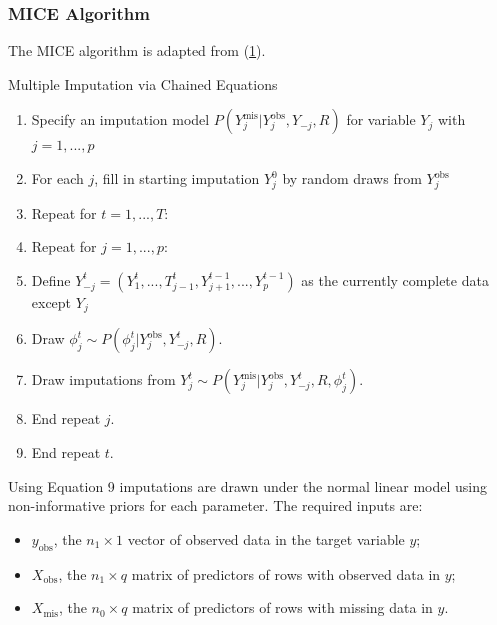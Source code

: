 \documentclass[12pt,]{article}
\providecommand{\tightlist}{%
  \setlength{\itemsep}{0pt}\setlength{\parskip}{0pt}}
\begin{document}
\subsubsection{MICE Algorithm}\label{mice-algorithm}

The MICE algorithm is adapted from
(\protect\hyperlink{ref-van_buuren_flexible_2012}{1}).

\begin{algorithm}[H]
\label{alg:mice-alg}
\caption{Multiple Imputation via Chained Equations}
\DontPrintSemicolon
\SetAlgoLined
\BlankLine

\begin{enumerate}
  \item Specify an imputation model $P(Y^{\text{mis}}_j \vert Y^{\text{obs}}_j, Y_{-j}, R)$ for variable $Y_j$ with $j=1,...,p$
  \item For each $j$, fill in starting imputation $Y^0_j$ by random draws from $Y^{\text{obs}}_j$
  \item Repeat for $t=1,...,T:$
  \item Repeat for $j=1,...,p:$
  \item Define $Y^t_{-j} = (Y^t_1,...,T^t_{j-1}, Y^{t-1}_{j+1},..., Y^{t-1}_p)$ as the currently complete data except $Y_j$ 
  \item Draw $\phi^t_j \sim P(\phi^t_j \vert Y^{\text{obs}}_j, Y^t_{-j}, R)$.
  \item Draw imputations from $Y^t_j \sim P(Y^{ \text{mis} }_j \vert Y^{ \text{obs} }_j, Y^t_{-j}, R, \phi^t_j)$.
  \item End repeat $j$.
  \item End repeat $t$.

\end{enumerate}
\BlankLine

\end{algorithm}

Using Equation 9 imputations are drawn under the normal linear model
using non-informative priors for each parameter. The required inputs
are:

\begin{itemize}
\tightlist
\item
  \(y_{\text{obs}}\), the \(n_1 \times 1\) vector of observed data in
  the target variable \(y\);
\item
  \(X_{\text{obs}}\), the \(n_1 \times q\) matrix of predictors of rows
  with observed data in \(y\);
\item
  \(X_{\text{mis}}\), the \(n_0 \times q\) matrix of predictors of rows
  with missing data in \(y\).
\end{itemize}
\end{document}
